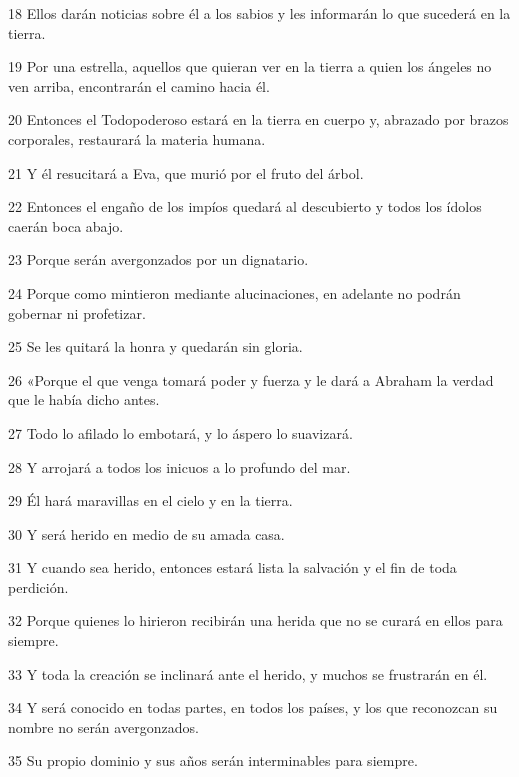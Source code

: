 \par 18 Ellos darán noticias sobre él a los sabios y les informarán lo que sucederá en la tierra.

\par 19 Por una estrella, aquellos que quieran ver en la tierra a quien los ángeles no ven arriba, encontrarán el camino hacia él.

\par 20 Entonces el Todopoderoso estará en la tierra en cuerpo y, abrazado por brazos corporales, restaurará la materia humana.

\par 21 Y él resucitará a Eva, que murió por el fruto del árbol.

\par 22 Entonces el engaño de los impíos quedará al descubierto y todos los ídolos caerán boca abajo.

\par 23 Porque serán avergonzados por un dignatario.

\par 24 Porque como mintieron mediante alucinaciones, en adelante no podrán gobernar ni profetizar.

\par 25 Se les quitará la honra y quedarán sin gloria.

\par 26 «Porque el que venga tomará poder y fuerza y ​​le dará a Abraham la verdad que le había dicho antes.

\par 27 Todo lo afilado lo embotará, y lo áspero lo suavizará.

\par 28 Y arrojará a todos los inicuos a lo profundo del mar.

\par 29 Él hará maravillas en el cielo y en la tierra.

\par 30 Y será herido en medio de su amada casa.

\par 31 Y cuando sea herido, entonces estará lista la salvación y el fin de toda perdición.

\par 32 Porque quienes lo hirieron recibirán una herida que no se curará en ellos para siempre.

\par 33 Y toda la creación se inclinará ante el herido, y muchos se frustrarán en él.

\par 34 Y será conocido en todas partes, en todos los países, y los que reconozcan su nombre no serán avergonzados.

\par 35 Su propio dominio y sus años serán interminables para siempre.

